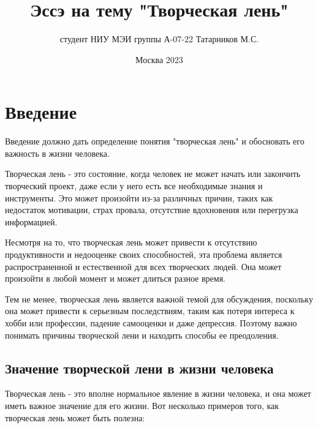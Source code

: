\documentclass[a4paper, 14pt]{article}
\title{Эссэ на тему "Творческая лень"}
\author{студент НИУ МЭИ группы А-07-22 Татарников М.С.}
\date{Москва 2023}
\begin{document}
\maketitle
\tableofcontents
\onehalfspacing

\section{Введение}
Введение должно дать определение понятия "творческая лень" и обосновать его важность в жизни человека. 



Творческая лень - это состояние, когда человек не может начать или закончить творческий проект, даже если у него есть все необходимые знания и инструменты. Это может произойти из-за различных причин, таких как недостаток мотивации, страх провала, отсутствие вдохновения или перегрузка информацией.

Несмотря на то, что творческая лень может привести к отсутствию продуктивности и недооценке своих способностей, эта проблема является распространенной и естественной для всех творческих людей. Она может произойти в любой момент и может длиться разное время.

Тем не менее, творческая лень является важной темой для обсуждения, поскольку она может привести к серьезным последствиям, таким как потеря интереса к хобби или профессии, падение самооценки и даже депрессия. Поэтому важно понимать причины творческой лени и находить способы ее преодоления.

\subsection{Значение творческой лени в жизни человека}
Творческая лень - это вполне нормальное явление в жизни человека, и она может иметь важное значение для его жизни. Вот несколько примеров того, как творческая лень может быть полезна:
\end{document}
